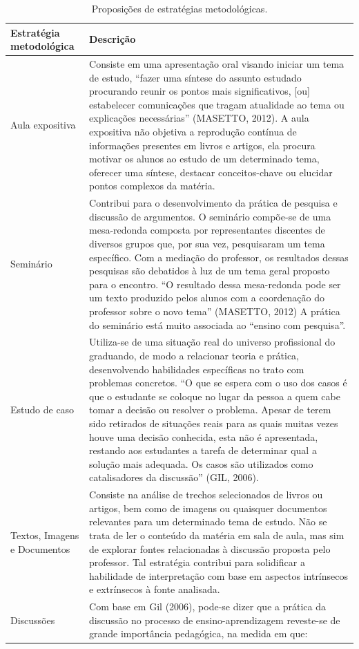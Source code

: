 \documentclass[
	12pt,				%
	openright,			%
  oneside,     %
	a4paper,			%
	chapter=TITLE,		%
	english,			%
	french,				%
	spanish,			%
	brazil				%
	]{abntex2}
\begin{document}
\begin{center}
    
    \begin{scriptsize}
        \begin{longtable}{p{4.5cm}p{10cm}}
            \caption{\label{quadro:proposicoes-estrategias-metodologicas}Proposições de estratégias metodológicas.}\\
      \toprule
      \textbf{Estratégia metodológica} & \textbf{Descrição}\\ 
        \midrule
        Aula expositiva & Consiste em uma apresentação oral visando iniciar um tema de estudo, “fazer uma síntese do assunto estudado procurando reunir os pontos mais significativos, [ou] estabelecer comunicações que tragam atualidade ao tema ou explicações necessárias” (MASETTO, 2012). A aula expositiva não objetiva a reprodução contínua de informações presentes em livros e artigos, ela procura motivar os alunos ao estudo de um determinado tema, oferecer uma síntese, destacar conceitos-chave ou elucidar pontos complexos da matéria.\\ \midrule
        Seminário & Contribui para o desenvolvimento da prática de pesquisa e discussão de argumentos. O seminário compõe-se de uma mesa-redonda composta por representantes discentes de diversos grupos que, por sua vez, pesquisaram um tema específico. Com a mediação do professor, os resultados dessas pesquisas são debatidos à luz de um tema geral proposto para o encontro. “O resultado dessa mesa-redonda pode ser um texto produzido pelos alunos com a coordenação do professor sobre o novo tema” (MASETTO, 2012) A prática do seminário está muito associada ao “ensino com pesquisa”. \\ \midrule
        Estudo de caso & Utiliza-se de uma situação real do universo profissional do graduando, de modo a relacionar teoria e prática, desenvolvendo habilidades específicas no trato com problemas concretos. “O que se espera com o uso dos casos é que o estudante se coloque no lugar da pessoa a quem cabe tomar a decisão ou resolver o problema. Apesar de terem sido retirados de situações reais para as quais muitas vezes houve uma decisão conhecida, esta não é apresentada, restando aos estudantes a tarefa de determinar qual a solução mais adequada. Os casos são utilizados como catalisadores da discussão” (GIL, 2006). \\ \midrule
        Textos, Imagens e Documentos & Consiste na análise de trechos selecionados de livros ou artigos, bem como de imagens ou quaisquer documentos relevantes para um determinado tema de estudo. Não se trata de ler o conteúdo da matéria em sala de aula, mas sim de explorar fontes relacionadas à discussão proposta pelo professor. Tal estratégia contribui para solidificar a habilidade de interpretação com base em aspectos intrínsecos e extrínsecos à fonte analisada. \\ \midrule
        Discussões & Com base em Gil (2006), pode-se dizer que a prática da discussão no processo de ensino-aprendizagem reveste-se de grande importância pedagógica, na medida em que:


\end{longtable}
\end{scriptsize}
\end{center}
\end{document}
